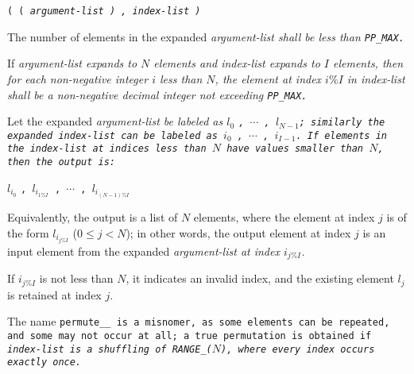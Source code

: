 
 \tt{( (} \it{argument-list} \tt{) ,} \it{index-list} \tt{)}


The number of elements in the expanded
\it{argument-list} shall be less than \tt{PP_MAX}.

If \it{argument-list} expands to $N$ elements and \it{index-list} expands
to $I$ elements, then for each non-negative integer $i$ less than $N$,
the element at index $i \% I$ in \it{index-list} shall be
a non-negative decimal integer not exceeding \tt{PP_MAX}.


Let the expanded \it{argument-list} be labeled as
$l_0$ \tt{,} $\cdots$ \tt{,} $l_{N - 1}$; similarly the expanded
\it{index-list} can be labeled as $i_0$ \tt{,} $\cdots$ \tt{,} $i_{I - 1}$.
If elements in the \it{index-list} at indices less than
$N$ have values smaller than $N$, then the output is:

\centerline
{$l_{i_0}$ \tt{,} $l_{i_{1\%I}}$ \tt{,} $\cdots$ \tt{,} $l_{i_{(N - 1)\%I}}$}

Equivalently, the output is a list of $N$ elements, where the
element at index $j$ is of the form $l_{i_{j\%I}}$ ($0 \le j < N$);
in other words, the output element at index $j$ is an input
element from the expanded \it{argument-list} at index $i_{j\%I}$.

If $i_{j\%I}$ is not less than $N$, it indicates an invalid index,
and the existing element $l_j$ is retained at index $j$.

\note The name \tt{permute__} is a misnomer, as some elements can be repeated,
and some may not occur at all; a true permutation is obtained if \it{index-list}
is a shuffling of \tt{RANGE_(}$N$\tt{)}, where every index occurs exactly once.
